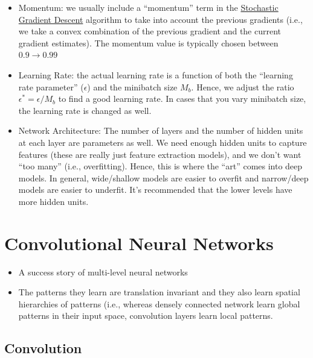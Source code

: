 \documentclass[
]{book}
\begin{document}
\begin{itemize}
  \begin{itemize}
  \item
    An estimate of the loss from the training and validation data
  \item
    Classification accuracy (error rate)
  \end{itemize}
\item
  Momentum: we usually include a ``momentum'' term in the \protect\hyperlink{stochastic-gradient-descent}{Stochastic Gradient Descent} algorithm to take into account the previous gradients (i.e., we take a convex combination of the previous gradient and the current gradient estimates). The momentum value is typically chosen between \(0.9 \to 0.99\)
\item
  Learning Rate: the actual learning rate is a function of both the ``learning rate parameter'' (\(\epsilon\)) and the minibatch size \(M_b\). Hence, we adjust the ratio \(\epsilon^* = \epsilon / M_b\) to find a good learning rate. In cases that you vary minibatch size, the learning rate is changed as well.
\item
  Network Architecture: The number of layers and the number of hidden units at each layer are parameters as well. We need enough hidden units to capture features (these are really just feature extraction models), and we don't want ``too many'' (i.e., overfitting). Hence, this is where the ``art'' comes into deep models. In general, wide/shallow models are easier to overfit and narrow/deep models are easier to underfit. It's recommended that the lower levels have more hidden units.
\end{itemize}

\hypertarget{convolutional-neural-networks}{%
\section{Convolutional Neural Networks}\label{convolutional-neural-networks}}

\begin{itemize}
\item
  A success story of multi-level neural networks
\item
  The patterns they learn are translation invariant and they also learn spatial hierarchies of patterns (i.e., whereas densely connected network learn global patterns in their input space, convolution layers learn local patterns.
\end{itemize}

\hypertarget{convolution}{%
\subsection{Convolution}\label{convolution}}
\end{document}
